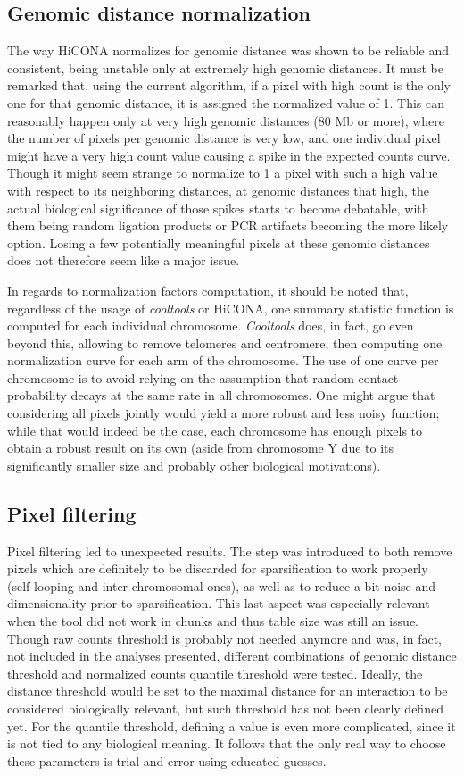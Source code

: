 \subsection{Genomic distance normalization}
The way HiCONA normalizes for genomic distance was shown to be reliable and consistent, being unstable only at extremely high genomic distances. It must be remarked that, using the current algorithm, if a pixel with high count is the only one for that genomic distance, it is assigned the normalized value of 1.
This can reasonably happen only at very high genomic distances (80 Mb or more), where the number of pixels per genomic distance is very low, and one individual pixel might have a very high count value causing a spike in the expected counts curve. Though it might seem strange to normalize to 1 a pixel with such a high value with respect to its neighboring distances, at genomic distances that high, the actual biological significance of those spikes starts to become debatable, with them being random ligation products or PCR artifacts becoming the more likely option. Losing a few potentially meaningful pixels at these genomic distances does not therefore seem like a major issue. 

In regards to normalization factors computation, it should be noted that, regardless of the usage of \textit{cooltools} or HiCONA, one summary statistic function is computed for each individual chromosome. \textit{Cooltools} does, in fact, go even beyond this, allowing to remove telomeres and centromere, then computing one normalization curve for each arm of the chromosome. The use of one curve per chromosome is to avoid relying on the assumption that random contact probability decays at the same rate in all chromosomes. One might argue that considering all pixels jointly would yield a more robust and less noisy function; while that would indeed be the case, each chromosome has enough pixels to obtain a robust result on its own (aside from chromosome Y due to its significantly smaller size and probably other biological motivations).

\subsection{Pixel filtering}
Pixel filtering led to unexpected results. The step was introduced to both remove pixels which are definitely to be discarded for sparsification to work properly (self-looping and inter-chromosomal ones), as well as to reduce a bit noise and dimensionality prior to sparsification. This last aspect was especially relevant when the tool did not work in chunks and thus table size was still an issue. Though raw counts threshold is probably not needed anymore and was, in fact, not included in the analyses presented, different combinations of genomic distance threshold and normalized counts quantile threshold were tested. Ideally, the distance threshold would be set to the maximal distance for an interaction to be considered biologically relevant, but such threshold has not been clearly defined yet. For the quantile threshold, defining a value is even more complicated, since it is not tied to any biological meaning. It follows that the only real way to choose these parameters is trial and error using educated guesses. 

